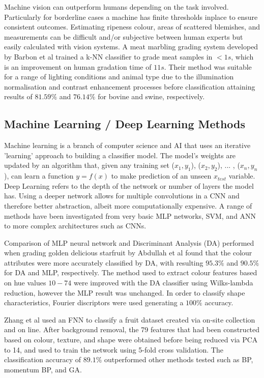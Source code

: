 \documentclass[fleqn,twoside]{article}
\begin{document}
Machine vision can outperform humans depending on the task involved. Particularly for borderline cases a machine has finite thresholds inplace to ensure consistent outcomes. Estimating ripeness colour, areas of scattered blemishes, and measurements can be difficult and/or subjective between human experts but easily calculated with vision systems. A meat marbling grading system developed by Barbon et al \cite{barbon} trained a k-NN classifier to grade meat samples in $<1s$, which is an improvement on human gradation time of $11s$. Their method was suitable for a range of lighting conditions and animal type due to the illumination normalisation and contrast enhancement processes before classification attaining results of $81.59\%$ and $76.14\%$ for bovine and swine, respectively. 



\subsection{Machine Learning / Deep Learning Methods}


Machine learning is a branch of computer science and AI that uses an iterative 'learning' approach to building a classifier model. The model's weights are updated by an algorithm that, given any training set ($x_1, y_1$), ($x_2, y_2$), ... , ($x_n, y_n$), can learn a function $y = f(x)$ to make prediction of an unseen $x_{test}$ variable. Deep Learning refers to the depth of the network or number of layers the model has. Using a deeper network allows for multiple convolutions in a CNN and therefore better abstraction, albeit more computationally expensive. A range of methods have been investigated from very basic MLP networks, SVM, and ANN to more complex architectures such as CNNs.


Comparison of MLP neural network and Discriminant Analysis (DA) performed when grading golden delicious starfruit by Abdullah et al \cite{abdullah} found that the colour attributes were more accurately classified by DA, with resulting $95.3\%$ and $90.5\%$ for DA and MLP, respectively. The method used to extract colour features based on hue values $10-74$ were improved with the DA classifier using Wilks-lambda reduction, however the MLP result was unchanged. In order to classify shape characteristics, Fourier discriptors were used generating a $100\%$ accuracy.


Zhang et al \cite{zhang} used an FNN to classify a fruit dataset created via on-site collection and on line. After background removal, the 79 features that had been constructed based on colour, texture, and shape were obtained before being reduced via PCA to 14, and used to train the network using 5-fold cross validation. The classification accuracy of $89.1\%$ outperformed other methods tested such as BP, momentum BP, and GA. 
\end{document}

